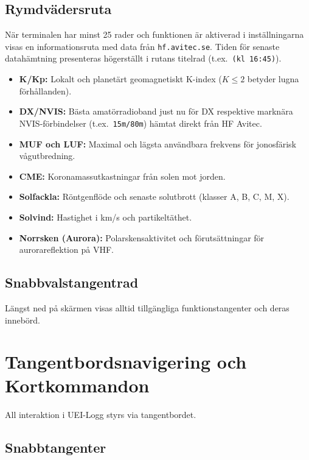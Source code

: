 \documentclass[11pt,a4paper]{article}
\begin{document}
\subsection{Rymdvädersruta}
När terminalen har minst 25 rader och funktionen är aktiverad i inställningarna visas en informationsruta med data från \texttt{hf.avitec.se}. Tiden för senaste datahämtning presenteras högerställt i rutans titelrad (t.ex.\ \texttt{(kl 16:45)}).
\begin{itemize}
    \item \textbf{K/Kp:} Lokalt och planetärt geomagnetiskt K-index ($K \le 2$ betyder lugna förhållanden).
    \item \textbf{DX/NVIS:} Bästa amatörradioband just nu för DX respektive marknära NVIS-förbindelser (t.ex.\ \texttt{15m/80m}) hämtat direkt från HF Avitec.
    \item \textbf{MUF och LUF:} Maximal och lägsta användbara frekvens för jonosfärisk vågutbredning.
    \item \textbf{CME:} Koronamassutkastningar från solen mot jorden.
    \item \textbf{Solfackla:} Röntgenflöde och senaste solutbrott (klasser A, B, C, M, X).
    \item \textbf{Solvind:} Hastighet i km/s och partikeltäthet.
    \item \textbf{Norrsken (Aurora):} Polarskensaktivitet och förutsättningar för aurorareflektion på VHF.
\end{itemize}

\subsection{Snabbvalstangentrad}
Längst ned på skärmen visas alltid tillgängliga funktionstangenter och deras innebörd.

\section{Tangentbordsnavigering och Kortkommandon}
\label{sec:keys}

All interaktion i UEI-Logg styrs via tangentbordet.

\subsection{Snabbtangenter}
\end{document}
